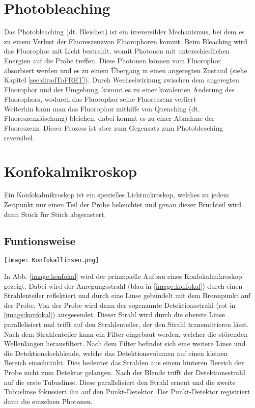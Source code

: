 \section{Photobleaching}
\label{sec:bleaching}
Das Photobleaching (dt. Bleichen) ist ein irreversibler Mechanismus, bei dem es zu einem Verlust der Fluoreszenzvon Fluorophoren kommt. Beim Bleaching wird das Fluorophor mit Licht bestrahlt, womit Photonen mit unterschiedlichen Energien auf die Probe treffen. Diese Photonen können vom Fluorophor absorbiert werden und es zu einem Übergang in einen angeregten Zustand (siehe Kapitel \ref{sec:dipolToFRET}). Durch Wechselwirkung zwischen dem angeregten Fluorophor und der Umgebung, kommt es zu einer kovalenten Änderung des Fluorophors, wodurch das Fluorophor seine Fluoreszenz verliert\\ Weiterhin kann man das Fluorophor mithilfe von Quenching (dt. Fluoreszenzlöschung) bleichen, dabei kommt es zu einer Abnahme der Fluoreszenz. Dieser Prozess ist aber zum Gegensatz zum Photobleaching reversibel. \citep{Bleach}
\section{Konfokalmikroskop}
\label{sec:konfokal}
Ein Konfokalmikroskop ist ein spezielles Lichtmikroskop, welches zu jedem Zeitpunkt nur einen Teil der Probe beleuchtet und genau dieser Bruchteil wird dann Stück für Stück abgerastert.
\subsection*{Funtionsweise}
\begin{center}
    \texttt{[image: Konfokallinsen.png]}
    \label{image:konfokal}
\end{center}
In Abb. \ref{image:konfokal} wird der prinzipielle Aufbau eines Konfokalmikroskop gezeigt. Dabei wird der Anregungsstrahl (blau in \ref{image:konfokal}) durch einen Strahlenteiler reflektiert und durch eine Linse gebündelt mit dem Brennpunkt auf der Probe. Von der Probe wird dann der sogenannte Detektionsstrahl (rot in \ref{image:konfokal}) ausgesendet. Dieser Strahl wird durch die oberste Linse parallelisiert und trifft auf den Strahlenteiler, der den Strahl transmittieren lässt. Nach dem Strahlenteiler kann ein Filter eingebaut werden, welcher die störenden Wellenlängen herausfiltert. Nach dem Filter befindet sich eine weitere Linse und die Detektionslochblende, welche das Detektionsvolumen auf einen kleinen Bereich einschränkt. Dies bedeutet das Strahlen aus einem hinteren Bereich der Probe nicht zum Detektor gelangen. Nach der Blende trifft der Detektionsstrahl auf die erste Tubuslinse. Diese parallelisiert den Strahl erneut und die zweite Tubuslinse fokussiert ihn auf den Punkt-Detektor. Der Punkt-Detektor registriert dann die einzelnen Photonen.
